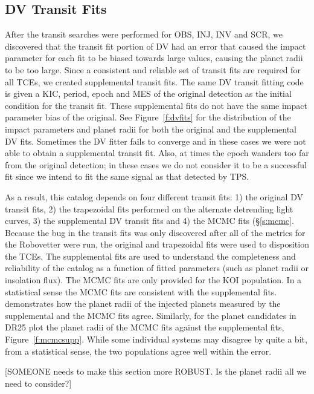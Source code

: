\subsection{DV Transit Fits}

After the transit searches were performed for OBS, INJ, INV and SCR, we discovered that the transit fit portion of DV had an error that caused the impact parameter for each fit to be biased towards large values, causing the planet radii to be too large. Since a consistent and reliable set of transit fits are required for all TCEs, we created supplemental transit fits.  The same DV transit fitting code is given a KIC, period, epoch and MES of the original detection as the initial condition for the transit fit. These supplemental fits do not have the same impact parameter bias of the original. See Figure~\ref{f:dvfits} for the distribution of the impact parameters and planet radii for both the original and the supplemental DV fits.  Sometimes the DV fitter fails to converge and in these cases we were not able to obtain a supplemental transit fit. Also, at times the epoch wanders too far from the original detection; in these cases we do not consider it to be a successful fit since we intend to fit the same signal as that detected by TPS.

As a result, this catalog depends on four different transit fits: 1) the original DV transit fits, 2) the trapezoidal fits performed on the alternate detrending light curves, 3) the supplemental DV transit fits and 4) the MCMC fits (\S\ref{s:mcmc}.  Because the bug in the transit fits was only discovered after all of the metrics for the Robovetter were run, the original and trapezoidal fits were used to disposition the TCEs.  The supplemental fits are used to understand the completeness and reliability of the catalog as a function of fitted parameters (such as planet radii or insolation flux).  The MCMC fits are only provided for the KOI population. In a statistical sense the MCMC fits are consistent with the supplemental fits. \citet{ChristiansenKSCI} demonstrates how the planet radii of the injected planets measured by the supplemental and the MCMC fits agree. Similarly, for the planet candidates in DR25 plot the planet radii of the MCMC fits against the supplemental fits, Figure~\ref{f:mcmcsupp}. While some individual systems may disagree by quite a bit, from a statistical sense, the two populations agree well within the error. 

[SOMEONE needs to make this section more ROBUST. Is the planet radii all we need to consider?]
